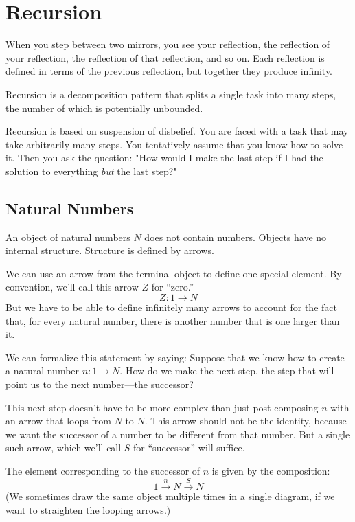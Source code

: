 \documentclass[DaoFP]{subfiles}
\begin{document}
\setcounter{chapter}{6}

\chapter{Recursion}

When you step between two mirrors, you see your reflection, the reflection of your reflection, the reflection of that reflection, and so on. Each reflection is defined in terms of the previous reflection, but together they produce infinity.

Recursion is a decomposition pattern that splits a single task into many steps, the number of which is potentially unbounded.  

Recursion is based on suspension of disbelief. You are faced with a task that may take arbitrarily many steps. You tentatively assume that you know how to solve it. Then you ask the question: "How would I make the last step if I had the solution to everything \emph{but} the last step?"

\section{Natural Numbers}

An object of natural numbers $N$ does not contain numbers. Objects have no internal structure. Structure is defined by arrows. 

We can use an arrow from the terminal object to define one special element. By convention, we'll call this arrow $Z$ for ``zero.''
\[ Z \colon 1 \to N \]
But we have to be able to define infinitely many arrows to account for the fact that, for every natural number, there is another number that is one larger than it. 

We can formalize this statement by saying: Suppose that we know how to create a natural number $n \colon 1 \to N$. How do we make the next step, the step that will point us to the next number---the successor? 

This next step doesn't have to be more complex than just post-composing $n$ with an arrow that loops from $N$ to $N$. This arrow should not be the identity, because we want the successor of a number to be different from that number. But a single such arrow, which we'll call $S$  for ``successor'' will suffice. 

The element corresponding to the successor of $n$ is given by the composition:
\[ 1 \xrightarrow{n} N \xrightarrow{S} N\]
(We sometimes draw the same object multiple times in a single diagram, if we want to straighten the looping arrows.)
\end{document}
